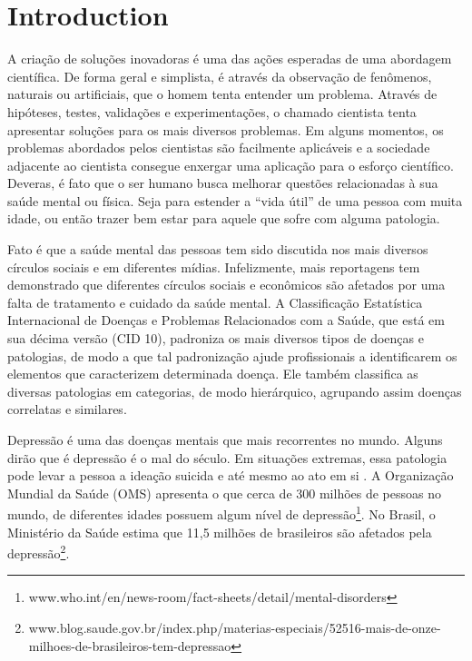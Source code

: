 \chapter{Introduction}\label{cap:introduction}

A criação de soluções inovadoras é uma das ações esperadas de uma abordagem científica. De forma geral e simplista, é através da observação de fenômenos, naturais ou artificiais, que o homem tenta entender um problema. Através de hipóteses, testes, validações e experimentações, o chamado cientista tenta apresentar soluções para os mais diversos problemas.
Em alguns momentos, os problemas abordados pelos cientistas são facilmente aplicáveis e a sociedade adjacente ao cientista consegue enxergar uma aplicação para o esforço científico.
Deveras, é fato que o ser humano busca melhorar questões relacionadas à sua saúde mental ou física. Seja para estender a ``vida útil'' de uma pessoa com muita idade, ou então trazer bem estar para aquele que sofre com alguma patologia.

Fato é que a saúde mental das pessoas tem sido discutida nos mais diversos círculos sociais e em diferentes mídias. Infelizmente, mais reportagens tem demonstrado que diferentes círculos sociais e econômicos são afetados por uma falta de tratamento e cuidado da saúde mental. A Classificação Estatística Internacional de Doenças e Problemas Relacionados com a Saúde, que está em sua décima versão (CID 10), padroniza os mais diversos tipos de doenças e patologias, de modo a que tal padronização ajude profissionais a identificarem os elementos que caracterizem determinada doença. Ele também classifica as diversas patologias em categorias, de modo hierárquico, agrupando assim doenças correlatas e similares.

Depressão é uma das doenças mentais que mais recorrentes no mundo. Alguns dirão que é depressão é o mal do século. Em situações extremas, essa patologia pode levar a pessoa a ideação suicida e até mesmo ao ato em si \cite{AmericanPsychiatryAssociationApa2013}. A Organização Mundial da Saúde (OMS) apresenta o que cerca de 300 milhões de pessoas no mundo, de diferentes idades possuem algum nível de depressão\footnote{www.who.int/en/news-room/fact-sheets/detail/mental-disorders}. No Brasil, o Ministério da Saúde estima que 11,5 milhões de brasileiros são afetados pela depressão\footnote{www.blog.saude.gov.br/index.php/materias-especiais/52516-mais-de-onze-milhoes-de-brasileiros-tem-depressao}.


